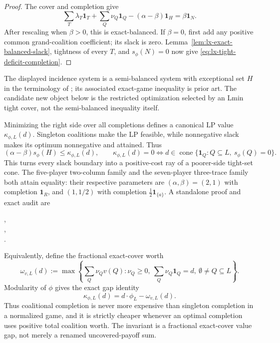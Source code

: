 \begin{proof}
The cover and completion give
\[
 \sum_T\lambda_T\mathbf1_T+\sum_Q\nu_Q\mathbf1_Q
 -(\alpha-\beta)\mathbf1_H=\beta\mathbf1_N.
\]
After rescaling when $\beta>0$, this is exact-balanced. If $\beta=0$, first
add any positive common grand-coalition coefficient; its slack is zero.
Lemma~\ref{lem:lx-exact-balanced-slack}, tightness of every $T$, and
$s_\phi(N)=0$ now give \eqref{eq:lx-tight-deficit-completion}.
\end{proof}

The displayed incidence system is a semi-balanced system with exceptional
set $H$ in the terminology of \citet{StudenyKratochvil2022}; its associated
exact-game inequality is prior art. The candidate new object below is the
restricted optimization selected by an Lmin tight cover, not the
semi-balanced inequality itself.

Minimizing the right side over all completions defines a canonical LP value
$\kappa_{\phi,L}(d)$. Singleton coalitions make the LP feasible, while
nonnegative slack makes its optimum nonnegative and attained. Thus
\[
 (\alpha-\beta)s_\phi(H)\leq\kappa_{\phi,L}(d),
 \qquad
 \kappa_{\phi,L}(d)=0
 \Longleftrightarrow
 d\in\operatorname{cone}\{\mathbf1_Q:Q\subseteq L,\ s_\phi(Q)=0\}.
 \tag{DC-K}\label{eq:lx-completion-cost}
\]
This turns every slack boundary into a positive-cost ray of a poorer-side
tight-set cone. The five-player two-column family and the seven-player
three-trace family both attain equality: their respective parameters are
$(\alpha,\beta)=(2,1)$ with completion $\mathbf1_R$, and
$(1,1/2)$ with completion $\tfrac12\mathbf1_{\{a\}}$. A standalone proof and
exact audit are
\begin{center}
\small{},\\[-2pt]
\small{},\\[-2pt]
\small{}.
\end{center}

Equivalently, define the fractional exact-cover worth
\[
 \omega_{v,L}(d):=\max\left\{
   \sum_Q\nu_Qv(Q):\nu_Q\geq0,
   \ \sum_Q\nu_Q\mathbf1_Q=d,\ \emptyset\ne Q\subseteq L\right\}.
\]
Modularity of $\phi$ gives the exact gap identity
\[
 \kappa_{\phi,L}(d)=d\mathbin{\cdot}\phi_L-\omega_{v,L}(d). \tag{DC-G}
 \label{eq:lx-completion-gap}
\]
Thus coalitional completion is never more expensive than singleton
completion in a normalized game, and it is strictly cheaper whenever an
optimal completion uses positive total coalition worth. The invariant is a
fractional exact-cover value gap, not merely a renamed uncovered-payoff sum.

